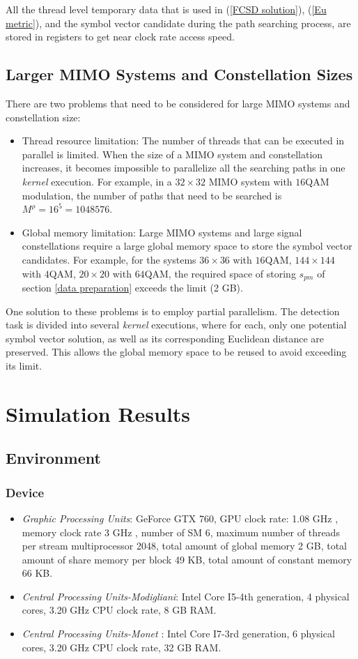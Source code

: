 \documentclass[letterpaper, 10pt, conference]{ieeeconf}
\begin{document}
All the thread level temporary data that is used in (\ref{FCSD solution}), (\ref{Eu metric}), and the symbol vector candidate during the path searching process, are stored in registers to get near clock rate access speed.   

\subsection{Larger MIMO Systems and Constellation Sizes}
There are two problems that need to be considered for large MIMO systems and constellation size:
\begin{itemize}
\item Thread resource limitation:
The number of threads that can be executed in parallel is limited. When the size of a MIMO system and constellation increases, it becomes impossible to parallelize all the searching paths in one \textit{kernel} execution. For example, in a $32\times 32$ MIMO system with $16$QAM modulation, the number of paths that need to be searched is $M^{\rho}=16^{5}=1048576$.  
\item Global memory limitation:
Large MIMO systems and large signal constellations require a large global memory space to store the symbol vector candidates. For example, for the systems $36\times 36$ with $16$QAM, $144\times 144$ with $4$QAM, $20\times 20$ with $64$QAM, the required space of storing $s_{pm}$ of section \ref{data preparation} exceeds the limit (2 GB).
\end{itemize}

One solution to these problems is to employ partial parallelism. The detection task is divided into several \textit{kernel} executions, where for each, only one potential symbol vector solution, as well as its corresponding Euclidean distance are preserved. This allows the global memory space to be reused to avoid exceeding its limit. 
\section{Simulation Results}\label{simulation}
\subsection{Environment}
\subsubsection{Device}
\begin{itemize}
\item \emph{Graphic Processing Units}: GeForce GTX 760, GPU clock rate: 1.08 GHz , memory clock rate 3 GHz , number of SM 6, maximum number of threads per stream multiprocessor 2048, total amount of global memory 2 GB, total amount of share memory per block 49 KB, total amount of constant memory 66 KB. 
\item \emph{Central Processing Units-Modigliani}: Intel Core I5-4th generation, 4 physical cores, 3.20 GHz CPU clock rate, 8 GB RAM.
\item \emph{Central Processing Units-Monet} : Intel Core I7-3rd generation, 6 physical cores, 3.20 GHz CPU clock rate, 32 GB RAM.
\end{itemize}
\end{document}
